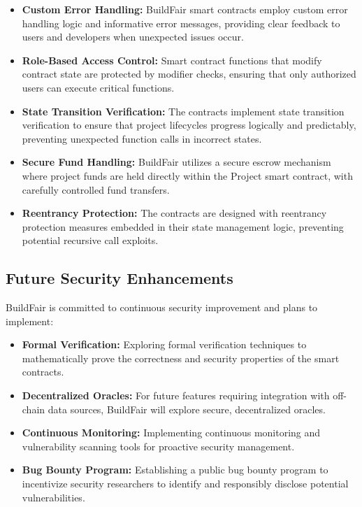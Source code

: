 \documentclass[12pt]{article}
\begin{document}
\begin{itemize}
    \item \textbf{Custom Error Handling:} BuildFair smart contracts employ custom error handling logic and informative error messages, providing clear feedback to users and developers when unexpected issues occur.
    
    \item \textbf{Role-Based Access Control:} Smart contract functions that modify contract state are protected by modifier checks, ensuring that only authorized users can execute critical functions.
    
    \item \textbf{State Transition Verification:} The contracts implement state transition verification to ensure that project lifecycles progress logically and predictably, preventing unexpected function calls in incorrect states.
    
    \item \textbf{Secure Fund Handling:} BuildFair utilizes a secure escrow mechanism where project funds are held directly within the Project smart contract, with carefully controlled fund transfers.
    
    \item \textbf{Reentrancy Protection:} The contracts are designed with reentrancy protection measures embedded in their state management logic, preventing potential recursive call exploits.
\end{itemize}

\subsection{Future Security Enhancements}
BuildFair is committed to continuous security improvement and plans to implement:

\begin{itemize}
    \item \textbf{Formal Verification:} Exploring formal verification techniques to mathematically prove the correctness and security properties of the smart contracts.
    
    \item \textbf{Decentralized Oracles:} For future features requiring integration with off-chain data sources, BuildFair will explore secure, decentralized oracles.
    
    \item \textbf{Continuous Monitoring:} Implementing continuous monitoring and vulnerability scanning tools for proactive security management.
    
    \item \textbf{Bug Bounty Program:} Establishing a public bug bounty program to incentivize security researchers to identify and responsibly disclose potential vulnerabilities.
\end{itemize}
\end{document}
